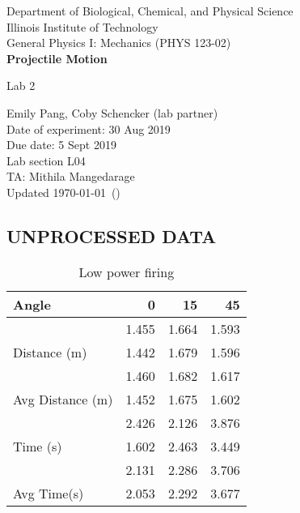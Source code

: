 \documentclass [12pt, letterpaper, twoside] {article}
\begin{document}
\begin {titlepage}
\begin {center}
Department of Biological, Chemical, and Physical Science\\
\vspace {0.1cm}
Illinois Institute of Technology\\
\vspace {0.1cm}
General Physics I: Mechanics (PHYS 123-02)\\
\vspace* {\fill}
\begingroup
\Large
\textbf {Projectile Motion}
\vspace {0.35cm}

\normalsize
Lab 2
\vspace {1.5cm}
\endgroup
\vspace* {\fill}
\end {center}

\vspace*{\fill}
\begin {flushright}
\footnotesize
Emily Pang, Coby Schencker (lab partner)\\
Date of experiment: 30 Aug 2019\\
Due date: 5 Sept 2019\\
Lab section L04\\
TA: Mithila Mangedarage\\
Updated \usdate\today~(\currenttime)
\end {flushright}
\end {titlepage}
\subsection* {UNPROCESSED DATA}
  \begin {table}[h]
   \centering
    \begin {tabular} {| l | r | r | r |}
      \hline\hline
      Angle & 0 & 15 & 45 \\
      \hline
      \multirow {3}{*}{Distance (m)} & 1.455 & 1.664 & 1.593 \\ 
      & 1.442 & 1.679 & 1.596 \\
      & 1.460 & 1.682 & 1.617 \\
      \hline
      Avg Distance (m) & 1.452 & 1.675 & 1.602 \\
      \hline
      \multirow {3}{*}{Time (s)} & 2.426 & 2.126 & 3.876 \\
      & 1.602 & 2.463 & 3.449 \\
      & 2.131 & 2.286 & 3.706 \\
      \hline
      Avg Time(s) & 2.053 & 2.292 & 3.677 \\
      \hline\hline
    \end {tabular}
    \caption {Low power firing}
  \end {table}
\end{document}
